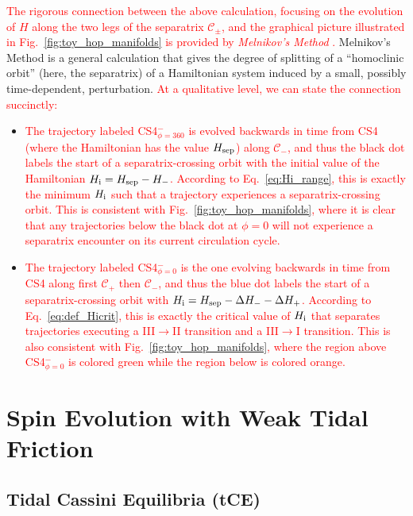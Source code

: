 \documentclass[
        fleqn,
        usenatbib,
        referee
    ]{mnras}
\begin{document}
\textcolor{red}{The rigorous connection between the above calculation, focusing
on the evolution of $H$ along the two legs of the separatrix
$\mathcal{C}_{\pm}$, and the graphical picture illustrated in
Fig.~\ref{fig:toy_hop_manifolds} is provided by \emph{Melnikov's Method}
\citep{g_and_h}.} Melnikov's Method is a general calculation that gives the
degree of splitting of a ``homoclinic orbit'' (here, the separatrix) of a
Hamiltonian system induced by a small, possibly time-dependent, perturbation.
\textcolor{red}{At a qualitative level, we can state the connection succinctly:}
\begin{itemize}
    \item \textcolor{red}{The trajectory labeled CS4$_{\phi = 360}^-$ is evolved
        backwards in time from CS4 (where the Hamiltonian has the value $H_{\rm
        sep}$) along $\mathcal{C}_-$, and thus the black dot labels the start of
        a separatrix-crossing orbit with the initial value of the Hamiltonian
        $H_{\rm i} = H_{\rm sep} - H_-$. According to Eq.~\eqref{eq:Hi_range},
        this is exactly the minimum $H_{\rm i}$ such that a trajectory
        experiences a separatrix-crossing orbit. This is consistent with
        Fig.~\ref{fig:toy_hop_manifolds}, where it is clear that any
        trajectories below the black dot at $\phi = 0$ will not experience a
        separatrix encounter on its current circulation cycle.}

    \item \textcolor{red}{The trajectory labeled CS4$_{\phi = 0}^-$ is the one
        evolving backwards in time from CS4 along first $\mathcal{C}_+$ then
        $\mathcal{C}_-$, and thus the blue dot labels the start of a
        separatrix-crossing orbit with $H_{\rm i} = H_{\rm sep} - \Delta H_{-} -
        \Delta H_+$. According to Eq.~\eqref{eq:def_Hicrit}, this is exactly the
        critical value of $H_{\rm i}$ that separates trajectories executing a
        III$\to$II transition and a III$\to$I transition. This is also
        consistent with Fig.~\ref{fig:toy_hop_manifolds}, where the region above
        CS4$_{\phi = 0}^-$ is colored green while the region below is colored
        orange.}
\end{itemize}

\section{Spin Evolution with Weak Tidal Friction}\label{s:full_tide_prob}

\subsection{Tidal Cassini Equilibria (tCE)}\label{ss:tce}
\end{document}
